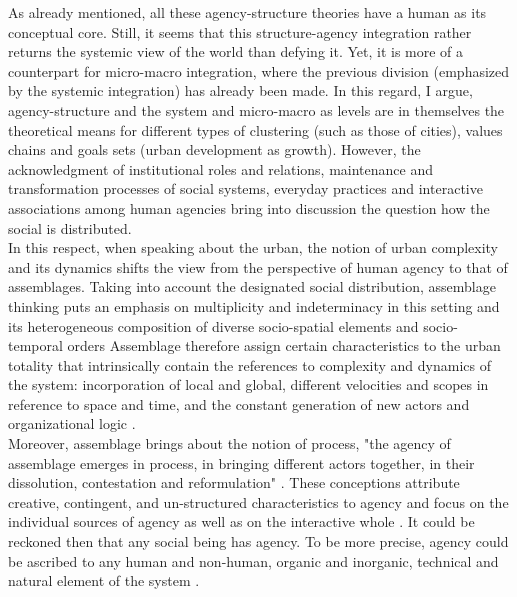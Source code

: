 \documentclass[11pt]{report}
\begin{document}
As already mentioned, all these agency-structure theories have a human as its conceptual core. Still, it seems that this structure-agency integration rather returns the systemic view of the world than defying it.
Yet, it is more of a counterpart for micro-macro integration, where the previous division (emphasized by the systemic integration) has already been made.
In this regard, I argue, agency-structure and the system and micro-macro as levels are in themselves the theoretical means for different types of clustering (such as those of cities), values chains and goals sets (urban development as growth).
However, the acknowledgment of institutional roles and relations, maintenance and transformation processes of social systems, everyday practices and interactive associations among human agencies bring into discussion the question how the social is distributed.
\\

In this respect, when speaking about the urban, the notion of urban complexity and its dynamics shifts the view from the perspective of human agency to that of assemblages. Taking into account the designated social distribution, assemblage thinking puts an emphasis on multiplicity and indeterminacy in this setting and its heterogeneous composition of diverse socio-spatial elements and socio-temporal orders \cite{Anderson and McFarlane 2011 ?????}
Assemblage therefore assign certain characteristics to the urban totality that intrinsically contain the references to complexity and dynamics of the system: incorporation of local and global, different velocities and scopes in reference to space and time, and the constant generation of new actors and organizational logic \cite{Sassen 2007}.
\\

Moreover, assemblage brings about the notion of process, "the agency of assemblage emerges in process, in bringing different actors together, in their dissolution,  contestation  and  reformulation"
\cite{McFarlane 2011}.
These conceptions attribute creative, contingent, and un-structured characteristics to agency \cite{Rafiee et al. 2014, McLeod 1987,Taylor 1991} and focus on the individual sources of agency as well as on the interactive whole \cite{McFarlane 2011}.
It could be reckoned then that any social being has agency. To be more precise, agency could be ascribed to any human and non-human, organic and inorganic, technical and natural element of the system \cite{Anderson and McFarlane 2011}.
\\
\end{document}

